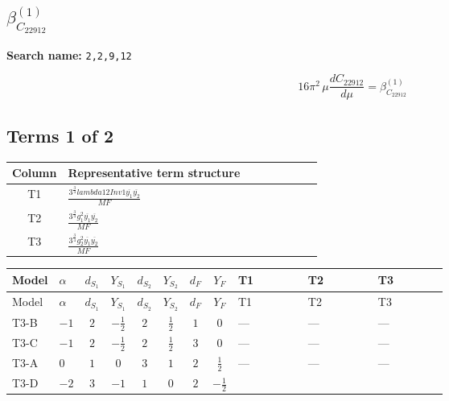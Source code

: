 \documentclass[8pt]{article}
\begin{document}
\begin{landscape}
\section*{$\beta_{C_{22912}}^{(1)}$}
\noindent\textbf{Search name: }\texttt{2,2,9,12}\par\smallskip
\[16\pi^2\,\mu\frac{d C_{22912}}{d\mu}=\beta_{C_{22912}}^{(1)}\]
\subsection*{Terms 1 of 2}
\begin{center}
\begin{tabular}{@{}c >{\raggedright\arraybackslash}p{0.82\linewidth}@{}}
\toprule
Column & Representative term structure \\
\midrule
T1 & \(\displaystyle \frac{3^{\frac{3}{4}} lambda12Inv1 \overline{y_{1}} \overline{y_{2}}}{MF}\) \\
\midrule
T2 & \(\displaystyle \frac{3^{\frac{3}{4}} g_{1}^{2} \overline{y_{1}} \overline{y_{2}}}{MF}\) \\
\midrule
T3 & \(\displaystyle \frac{3^{\frac{3}{4}} g_{2}^{2} \overline{y_{1}} \overline{y_{2}}}{MF}\) \\
\midrule
\bottomrule
\end{tabular}
\end{center}
\smallskip
\tiny
\begin{longtable}{@{}llcccccc >{\raggedright\arraybackslash}p{0.21\linewidth} >{\raggedright\arraybackslash}p{0.21\linewidth} >{\raggedright\arraybackslash}p{0.21\linewidth}@{}}
\toprule
Model & $\alpha$ & $d_{S_1}$ & $Y_{S_1}$ & $d_{S_2}$ & $Y_{S_2}$ & $d_F$ & $Y_F$ & T1 & T2 & T3 \\
\midrule
\endfirsthead
\toprule
Model & $\alpha$ & $d_{S_1}$ & $Y_{S_1}$ & $d_{S_2}$ & $Y_{S_2}$ & $d_F$ & $Y_F$ & T1 & T2 & T3 \\
\midrule
\endhead
T3-B & $-1$ & $2$ & $-\frac{1}{2}$ & $2$ & $\frac{1}{2}$ & $1$ & $0$ & --- & --- & --- \\
\midrule
T3-C & $-1$ & $2$ & $-\frac{1}{2}$ & $2$ & $\frac{1}{2}$ & $3$ & $0$ & --- & --- & --- \\
\midrule
T3-A & $0$ & $1$ & $0$ & $3$ & $1$ & $2$ & $\frac{1}{2}$ & --- & --- & --- \\
\midrule
T3-D & $-2$ & $3$ & $-1$ & $1$ & $0$ & $2$ & $-\frac{1}{2}$ & \scriptsize\adjustbox{max width=\linewidth}{$\begin{gathered} \frac{3^{\frac{3}{4}} lambda12Inv1 \overline{y_{1}} \overline{y_{2}}}{6 MF}\end{gathered}$} & \scriptsize\adjustbox{max width=\linewidth}{$\begin{gathered} \frac{3^{\frac{3}{4}} g_{1}^{2} \overline{y_{1}} \overline{y_{2}}}{8 MF}\end{gathered}$} & \scriptsize\adjustbox{max width=\linewidth}{$\begin{gathered} \frac{17 \cdot 3^{\frac{3}{4}} g_{2}^{2} \overline{y_{1}} \overline{y_{2}}}{24 MF}\end{gathered}$} \\

\end{longtable}
\end{landscape}
\end{document}
